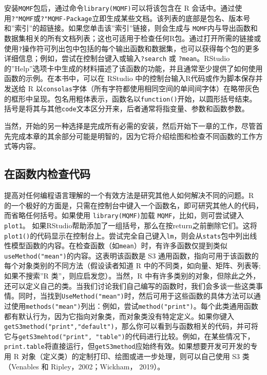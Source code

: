 \documentclass[
  lang=cn,
  11pt,
  scheme=chinese,
  chinesefont=nofont,
  citestyle=gb7714-2015,
  bibstyle=gb7714-2015]{elegantbook}
\begin{document}
安装\texttt{MQMF}包后，通过命令\texttt{library(MQMF)}可以将该包含在 R 会话中。通过使用\texttt{?"MQMF}或\texttt{?"MQMF-Package}立即生成某些文档。该列表的底部是包名、版本号和''索引''的超链接。如果您单击该''索引''链接，则会生成与 \texttt{MQMF}内与导出函数和数据集相关的所有文档列表；这也可适用于检查任何R包。通过打开所需的链接或使用\texttt{?}操作符可列出包中包括的每个输出函数和数据集，也可以获得每个包的更多详细信息；例如，尝试在控制台键入或输入\texttt{?search} 或 \texttt{?mean}。RStudio 的''Help''选项卡中生成的材料描述了该函数的功能，并且通常至少提供了如何使用函数的示例。在本书中，可以在 RStudio 中的控制台输入R代码或作为脚本保存并发送给 R 以\texttt{consolas}字体（所有字符都使用相同空间的单间间字体）在略带灰色的框形中呈现。包名用粗体表示，函数名以\texttt{function()}开始，以圆形括号结束。括号是将其与其他\texttt{code}文本区分开来，后者通常将指变量、参数和函数参数。

当然，开始的另一种选择是完成所有必需的安装，然后开始下一章的工作，尽管首先完成本章的其余部分可能是明智的，因为它将介绍绘图和检查不同函数的工作方式等内容。

\subsection{在函数内检查代码}\label{ux5728ux51fdux6570ux5185ux68c0ux67e5ux4ee3ux7801}

提高对任何编程语言理解的一个有效方法是研究其他人如何解决不同的问题。R 的一个极好的方面是，只需在控制台中键入一个函数名，即可研究其他人的代码，而省略任何括号。如果使用 \texttt{library(MQMF)}加载 \texttt{MQMF}，比如，则可尝试键入\texttt{plot1}。 如果RStudio帮助添加了一组括号，那么在按return之前删除它们。这将\texttt{plot1()}的代码显示在控制台上。尝试完全自己键入\texttt{lm}，则会从\texttt{stats}包中列出线性模型函数的内容。在检查函数（如\texttt{mean}）时，有许多函数仅提到类似\texttt{useMethod("mean")}的内容。这表明该函数是 S3 通用函数，指向可用于该函数的每个对象类别的不同方法（假设读者知道 R 中的不同类，如向量、矩阵、列表等;如果不搜索''R 类''，则应启发您）。当然，R 中有许多类别的对象，但除此之外，还可以定义自己的类。当我们讨论我们自己编写的函数时，我们会多谈一些这类事情。同时，当找到\texttt{UseMethod("mean")}时，然后可用于这些函数的具体方法可以通过使用\texttt{methods("mean")}列出：例如，尝试\texttt{method("print")}。每个此类通用函数都有默认行为，因为它指向对象类，而对象类没有特定定义。如果你键入\texttt{getS3method("print","default")}，那么你可以看到与函数相关的代码，并可将它与\texttt{getS3mehtod("print",\ "table")}的代码进行比较。例如，在某些情况下，\texttt{print.table}将直接运行，但\texttt{getS3method}应始终有效。如果想要开发可开发的专用 R 对象（定义类）的定制打印、绘图或进一步处理，则可以自己使用 S3 类（Venables 和 Ripley，2002；Wickham， 2019）。
\end{document}
